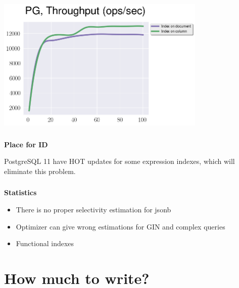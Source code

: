 \documentclass[usenames,dvipsnames, 18pt, compress, aspectratio=169]{beamer}
\begin{document}
\begin{frame}
    \frametitle{}
    \begin{center}

        \includegraphics[width=0.75\textwidth,center]{pg_id_place.png}

    \end{center}
\end{frame}

\begin{frame}
    \frametitle{}
    \begin{center}
        \textbf{Place for ID}

        \begin{flushleft}
            PostgreSQL 11 have HOT updates for some expression indexes, which will
            eliminate this problem.
        \end{flushleft}

    \end{center}
\end{frame}

\begin{frame}
    \frametitle{}
    \begin{center}
    \textbf{Statistics}

        \begin{itemize}[label={\MVRightarrow}]
            \item There is no proper selectivity estimation for jsonb
            \item Optimizer can give wrong estimations for GIN and complex queries
            \item Functional indexes
        \end{itemize}

    \end{center}
\end{frame}

\fontsize{13pt}{14}\selectfont
\section{How much to write?}
\fontsize{17pt}{18}\selectfont
\end{document}
